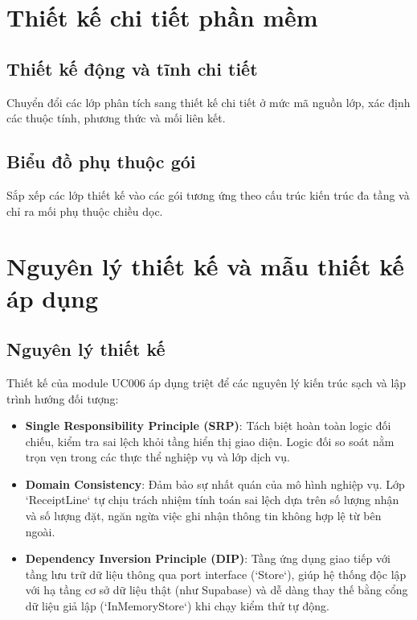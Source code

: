 \documentclass[12pt]{extreport}
\begin{document}
\chapter{Thiết kế chi tiết phần mềm}
\section{Thiết kế động và tĩnh chi tiết}
Chuyển đổi các lớp phân tích sang thiết kế chi tiết ở mức mã nguồn lớp, xác định các thuộc tính, phương thức và mối liên kết.

\section{Biểu đồ phụ thuộc gói}
Sắp xếp các lớp thiết kế vào các gói tương ứng theo cấu trúc kiến trúc đa tầng và chỉ ra mối phụ thuộc chiều dọc.

\chapter{Nguyên lý thiết kế và mẫu thiết kế áp dụng}
\section{Nguyên lý thiết kế}
Thiết kế của module UC006 áp dụng triệt để các nguyên lý kiến trúc sạch và lập trình hướng đối tượng:
\begin{itemize}
    \item \textbf{Single Responsibility Principle (SRP)}: Tách biệt hoàn toàn logic đối chiếu, kiểm tra sai lệch khỏi tầng hiển thị giao diện. Logic đối so soát nằm trọn vẹn trong các thực thể nghiệp vụ và lớp dịch vụ.
    \item \textbf{Domain Consistency}: Đảm bảo sự nhất quán của mô hình nghiệp vụ. Lớp `ReceiptLine` tự chịu trách nhiệm tính toán sai lệch dựa trên số lượng nhận và số lượng đặt, ngăn ngừa việc ghi nhận thông tin không hợp lệ từ bên ngoài.
    \item \textbf{Dependency Inversion Principle (DIP)}: Tầng ứng dụng giao tiếp với tầng lưu trữ dữ liệu thông qua port interface (`Store`), giúp hệ thống độc lập với hạ tầng cơ sở dữ liệu thật (như Supabase) và dễ dàng thay thế bằng cổng dữ liệu giả lập (`InMemoryStore`) khi chạy kiểm thử tự động.
\end{itemize}
\end{document}
